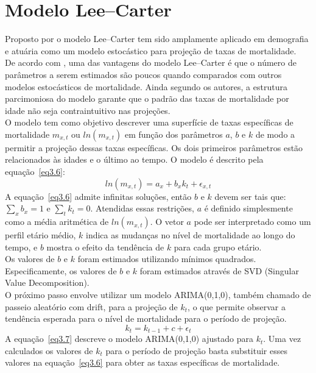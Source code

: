 \documentclass[12pt, 						%
			openright, 					%
			twoside,					%
			a4paper,x					%
			english,					%
			brazil]{abntex2}				%
\begin{document}
	\section{Modelo Lee--Carter \label{sec3.3}}
	Proposto por  o modelo Lee--Carter  tem sido amplamente aplicado em demografia e atuária como um modelo estocástico para projeção de taxas de mortalidade. \cite{alonso2015forecasting, mitchell2013modeling, cocco2012longevity}\\
	De acordo com , uma das vantagens do modelo Lee--Carter é que o número de parâmetros a serem estimados são poucos quando comparados com outros modelos estocásticos de mortalidade. Ainda segundo os autores, a estrutura parcimoniosa do modelo garante que  o padrão das taxas de mortalidade por idade não seja contraintuitivo nas projeções. \\
	O modelo tem como objetivo descrever uma superfície de taxas específicas de mortalidade $m_{x,t}$ ou $ln(m_{x,t})$ em função dos parâmetros $a$, $b$ e $k$ de modo a permitir a projeção dessas taxas específicas. Os dois primeiros parâmetros estão relacionados às idades e o último ao tempo. O modelo é descrito pela equação~\ref{eq3.6}:
	\begin{equation} \label{eq3.6}
		ln(m_{x,t}) = a_{x} + b_{x}k_{t} + \epsilon_{x,t}
	\end{equation}
	A equação~\ref{eq3.6} admite infinitas soluções, então $b$ e $k$ devem ser tais que: $\sum_{x}b_{x} = 1$ e $\sum_{t}k_{t} = 0$. Atendidas essas restrições, $a$ é definido simplesmente como a média aritmética de $ln(m_{x,t})$. O vetor $a$ pode ser interpretado como um perfil etário médio, $k$ indica as mudanças no nível de mortalidade ao longo do tempo, e $b$ mostra o efeito da tendência de $k$ para cada grupo etário. \\
	Os valores de $b$ e $k$ foram estimados utilizando mínimos quadrados. Especificamente, os valores de $b$ e $k$ foram estimados através de SVD (Singular Value Decomposition). \\
	O próximo passo envolve utilizar um modelo ARIMA(0,1,0), também chamado de passeio aleatório com drift, para a projeção de $k_{t}$, o que permite observar a tendência esperada para o nível de mortalidade para o período de projeção.
	\begin{equation} \label{eq3.7}
		k_{t} = k_{t-1} + c + \epsilon_{t} 
	\end{equation}
	A equação~\ref{eq3.7} descreve o modelo ARIMA(0,1,0) ajustado para $k_{t}$. Uma vez calculados os valores de $k_{t}$ para o período de projeção basta substituir esses valores na equação~\ref{eq3.6} para obter as taxas específicas de mortalidade.
\end{document}
